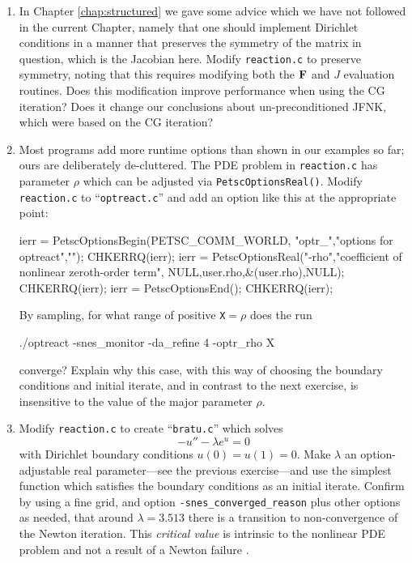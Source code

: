 \begin{enumerate}
\item \label{exer:nl:symmetrizeJ}  In Chapter \ref{chap:structured} we gave some advice which we have not followed in the current Chapter, namely that one should implement Dirichlet conditions in a manner that preserves the symmetry of the matrix in question, which is the Jacobian here.  Modify \texttt{reaction.c} to preserve symmetry, noting that this requires modifying both the $\mathbf{F}$ and $J$ evaluation routines.  Does this modification improve performance when using the CG iteration?  Does it change our conclusions about un-preconditioned JFNK, which were based on the CG iteration?

\item Most \PETSc programs add more runtime options than shown in our examples so far; ours are deliberately de-cluttered.  The PDE problem in \texttt{reaction.c} has parameter $\rho$ which can be adjusted via \texttt{PetscOptionsReal()}.  Modify \texttt{reaction.c} to ``\texttt{optreact.c}'' and add an option like this at the appropriate point:
\begin{code}
  ierr = PetscOptionsBegin(PETSC_COMM_WORLD,
                           "optr_","options for optreact",""); CHKERRQ(ierr);
  ierr = PetscOptionsReal("-rho","coefficient of nonlinear zeroth-order term",
                          NULL,user.rho,&(user.rho),NULL); CHKERRQ(ierr);
  ierr = PetscOptionsEnd(); CHKERRQ(ierr);
\end{code}
By sampling, for what range of positive \texttt{X}$=\rho$ does the run
\begin{cline}
./optreact -snes_monitor -da_refine 4 -optr_rho X
\end{cline}
converge?  Explain why this case, with this way of choosing the boundary conditions and initial iterate, and in contrast to the next exercise, is insensitive to the value of the major parameter $\rho$.

\item \label{exer:nl:bratu} Modify \texttt{reaction.c} to create ``\texttt{bratu.c}'' which solves
\begin{equation}
    - u'' - \lambda e^u = 0 \label{eq:nl:bratuoned}
\end{equation}
with Dirichlet boundary conditions $u(0)=u(1)=0$.  Make $\lambda$ an option-adjustable real parameter---see the previous exercise---and use the simplest function which satisfies the boundary conditions as an initial iterate.  Confirm by using a fine grid, and option \texttt{-snes\_converged\_reason} plus other options as needed, that around $\lambda=3.513$ there is a transition to non-convergence of the Newton iteration.  This \emph{critical value} is intrinsic to the nonlinear PDE problem and not a result of a Newton failure \citep{Doedeletal1991}.


\end{enumerate}
